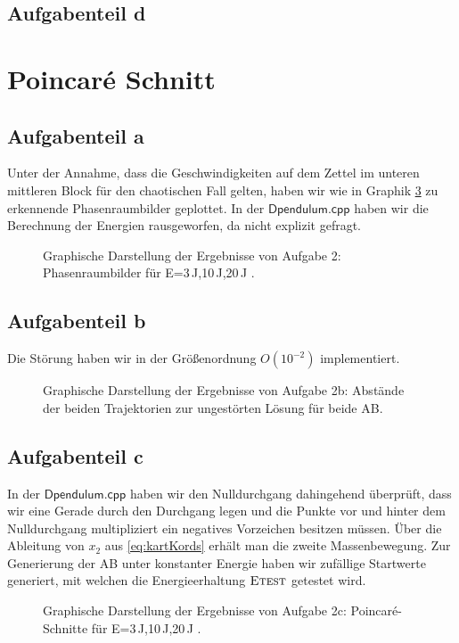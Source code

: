 \subsection*{Aufgabenteil d} %

\section*{Poincar\'{e} Schnitt}
\subsection*{Aufgabenteil a}
Unter der Annahme, dass die Geschwindigkeiten auf dem Zettel im unteren mittleren Block für den chaotischen Fall gelten, haben wir wie in Graphik \ref{fig:OsziC1} zu erkennende Phasenraumbilder geplottet. In der $\textsf{Dpendulum.cpp}$ haben wir die Berechnung der Energien rausgeworfen, da nicht explizit gefragt.

\begin{landscape}
	\begin{figure}
		\caption{Graphische Darstellung der Ergebnisse von Aufgabe 2: Phasenraumbilder für E=3$\,$J,10$\,$J,20$\,$J .}
		\label{fig:OsziC1}
	\end{figure}
\end{landscape} 
\subsection*{Aufgabenteil b}
Die Störung haben wir in der Größenordnung $O(10^{-2})$ implementiert. %
\begin{landscape}
	\begin{figure}
		\caption{Graphische Darstellung der Ergebnisse von Aufgabe 2b: Abstände der beiden Trajektorien zur ungestörten Lösung für beide AB.}
		\label{fig:OsziC1}
	\end{figure}
\end{landscape} 
 
\subsection*{Aufgabenteil c}
In der $\textsf{Dpendulum.cpp}$ haben wir den Nulldurchgang dahingehend überprüft, dass wir eine Gerade durch den Durchgang legen und die Punkte vor und hinter dem Nulldurchgang multipliziert ein negatives Vorzeichen besitzen müssen. Über die Ableitung von $x_2$ aus \ref{eq:kartKords} erhält man die zweite Massenbewegung. %
Zur Generierung der AB unter konstanter Energie haben wir zufällige Startwerte generiert, mit welchen die Energieerhaltung $\textsc{Etest}$ getestet wird. 
\begin{landscape}
	\begin{figure}
		\caption{Graphische Darstellung der Ergebnisse von Aufgabe 2c: Poincar\'{e}-Schnitte für E=3$\,$J,10$\,$J,20$\,$J .}
		\label{fig:OsziC1}
	\end{figure}
\end{landscape} 


